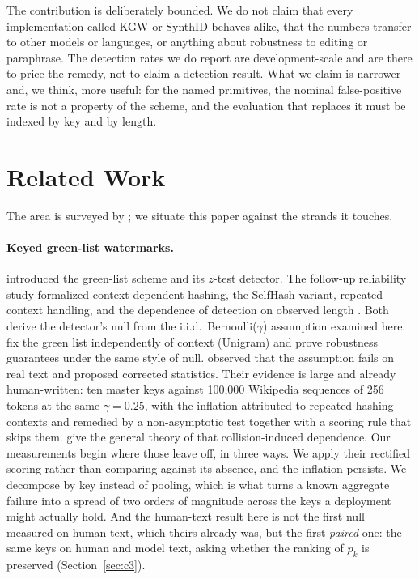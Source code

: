 \documentclass[conference]{IEEEtran}
\begin{document}
The contribution is deliberately bounded. We do not claim that every
implementation called KGW or SynthID behaves alike, that the numbers transfer to
other models or languages, or anything about robustness to editing or
paraphrase. The detection rates we do report are development-scale and are there
to price the remedy, not to claim a detection result. What we claim is narrower and, we think, more
useful: for the named primitives, the nominal false-positive rate is not a
property of the scheme, and the evaluation that replaces it must be indexed by
key and by length.

\section{Related Work}

The area is surveyed by \citet{liu2025survey}; we situate this paper against the
strands it touches.

\paragraph{Keyed green-list watermarks.}
\citet{kirchenbauer2023watermark} introduced the green-list scheme and its
$z$-test detector. The follow-up reliability study formalized context-dependent
hashing, the SelfHash variant, repeated-context handling, and the dependence of
detection on observed length \citep{kirchenbauer2024reliability}. Both derive the
detector's null from the i.i.d.\ Bernoulli($\gamma$) assumption examined here.
\citet{zhao2023unigram} fix the green list independently of context (Unigram) and
prove robustness guarantees under the same style of null.
\citet{fernandez2023bricks} observed that the assumption fails on real text and
proposed corrected statistics. Their evidence is large and already human-written:
ten master keys against 100{,}000 Wikipedia sequences of 256 tokens at the same
$\gamma=0.25$, with the inflation attributed to repeated hashing contexts and
remedied by a non-asymptotic test together with a scoring rule that skips them.
\citet{cai2025collision} give the general theory of that collision-induced
dependence. Our measurements begin where those leave off, in three ways. We apply
their rectified scoring rather than comparing against its absence, and the
inflation persists. We decompose by key instead of pooling, which is what turns a
known aggregate failure into a spread of two orders of magnitude across the keys a
deployment might actually hold. And the human-text result here is not the first
null measured on human text, which theirs already was, but the first \emph{paired}
one: the same keys on human and model text, asking whether the ranking of $p_k$ is
preserved (Section~\ref{sec:c3}).
\end{document}
